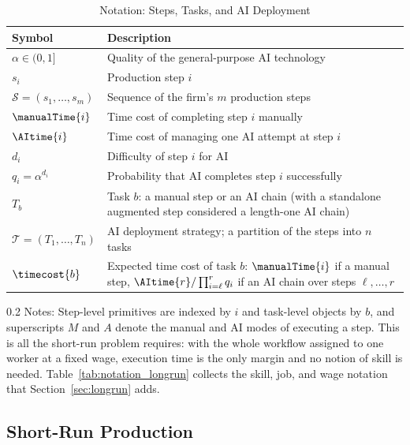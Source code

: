\begin{table}[!t]
\centering
\caption{Notation: Steps, Tasks, and AI Deployment}
\label{tab:notation_shortrun}
    \footnotesize
\begin{tabularx}{\textwidth}{l X}
\toprule
\textbf{Symbol} & \textbf{Description} \\
\midrule
\addlinespace
$\alpha \in (0,1]$ & Quality of the general-purpose AI technology \\
\addlinespace
$s_i$ & Production step $i$ \\
$\mathcal{S} = (s_1, \dotsc, s_m)$ & Sequence of the firm's $m$ production steps \\
$\manualTime{i}$ & Time cost of completing step $i$ manually \\
$\AItime{i}$ & Time cost of managing one AI attempt at step $i$ \\
$d_i$ & Difficulty of step $i$ for AI \\
$q_i = \alpha^{d_i}$ & Probability that AI completes step $i$ successfully \\
\addlinespace
$T_b$ & Task $b$: a manual step or an AI chain (with a standalone augmented step considered a length-one AI chain) \\
$\mathcal{T} = (T_1, \dotsc, T_n)$ & AI deployment strategy; a partition of the steps into $n$ tasks \\
$\timecost{b}$ & Expected time cost of task $b$: $\manualTime{i}$ if a manual step, $\AItime{r}/\prod_{i=\ell}^{r} q_i$ if an AI chain over steps $\ell, \dotsc, r$ \\
\bottomrule
\end{tabularx}

    \begin{minipage}{1\linewidth}
\begin{spacing}{0.2}
{\fontsize{9.5pt}{10pt}\selectfont Notes: Step-level primitives are indexed by $i$ and task-level objects by $b$, and superscripts $M$ and $A$ denote the manual and AI modes of executing a step.
This is all the short-run problem requires: with the whole workflow assigned to one worker at a fixed wage, execution time is the only margin and no notion of skill is needed.
Table~\ref{tab:notation_longrun} collects the skill, job, and wage notation that Section~\ref{sec:longrun} adds.}
\end{spacing}
\end{minipage}
\end{table}



\subsection{Short-Run Production}
\label{sec:shortrun.production}

